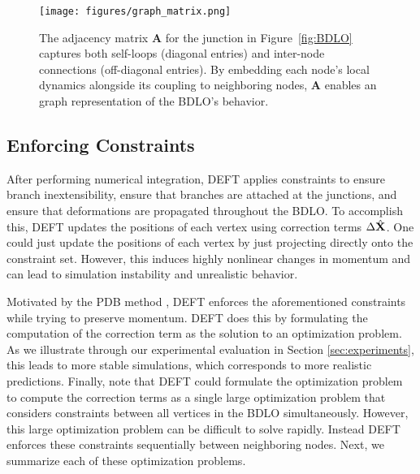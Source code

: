 

\begin{figure}
    \centering
    \texttt{[image: figures/graph\_matrix.png]}
    \caption{
    The adjacency matrix $\mathbf{A}$ for the junction in Figure~\ref{fig:BDLO} 
    captures both self-loops (diagonal entries) and inter-node connections 
    (off-diagonal entries). By embedding each node’s local dynamics 
    alongside its coupling to neighboring nodes, $\mathbf{A}$ enables 
    an graph representation of the BDLO’s behavior.}
    \label{fig:matrix_A_illustration}
\end{figure}

\subsection{Enforcing Constraints}
\label{section:constratins}

After performing numerical integration, DEFT applies constraints to ensure branch inextensibility, ensure that branches are attached at the junctions, and ensure that deformations are propagated throughout the BDLO. 
To accomplish this, DEFT updates the positions of each vertex using correction terms $\Delta \hat{\mathbf{X}}_\text{}$.
One could just update the positions of each vertex by just projecting directly onto the constraint set. 
However, this induces highly nonlinear changes in momentum and can lead to simulation instability and unrealistic behavior. 

Motivated by the PDB method \cite{PBD}, DEFT enforces the aforementioned constraints while trying to preserve momentum.
DEFT does this by formulating the computation of the correction term as the solution to an optimization problem.
As we illustrate through our experimental evaluation in Section \ref{sec:experiments}, this leads to more stable simulations, which corresponds to more realistic predictions. 
Finally, note that DEFT could formulate the optimization problem to compute the correction terms as a single large optimization problem that considers constraints between all vertices in the BDLO simultaneously. 
However, this large optimization problem can be difficult to solve rapidly. 
Instead DEFT enforces these constraints sequentially between neighboring nodes.
Next, we summarize each of these optimization problems.


